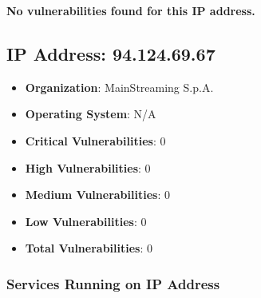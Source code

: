\documentclass{article}
\begin{document}
\textbf{No vulnerabilities found for this IP address.}




\clearpage



\subsection{IP Address: 94.124.69.67}

\begin{itemize}
    \item \textbf{Organization}: MainStreaming S.p.A.
    \item \textbf{Operating System}:  N/A 
    \item \textbf{Critical Vulnerabilities}: 0
    \item \textbf{High Vulnerabilities}: 0
    \item \textbf{Medium Vulnerabilities}: 0
    \item \textbf{Low Vulnerabilities}: 0
    \item \textbf{Total Vulnerabilities}: 0
\end{itemize}

\subsubsection*{Services Running on IP Address}
\end{document}
